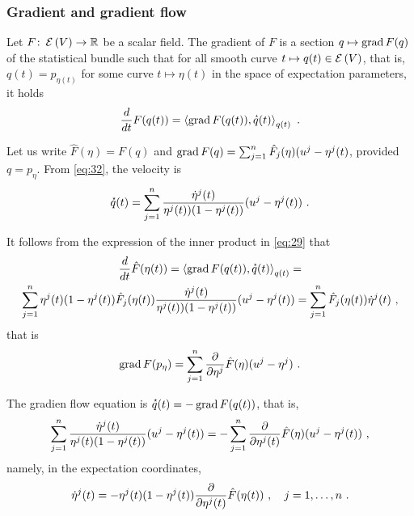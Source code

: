\documentclass[12pt,a4paper]{amsart}
\theoremstyle{remark}
\begin{document}
\subsubsection{Gradient and gradient flow}
\label{sec:gradient}

Let $F \colon \operatorname{\mathcal E}\left(V\right) \to \mathbb{R}$ be a scalar field. The gradient of $F$ is a section  $q \mapsto \operatorname{grad} F(q)$ of the statistical bundle such that for all smooth curve $t \mapsto q(t) \in \operatorname{\mathcal E}\left(V\right)$, that is, $q(t) = p_{\eta(t)}$ for some curve $t \mapsto \eta(t)$ in the space of expectation parameters, it holds
\begin{equation}
  \label{eq:gradient}
  \derivby t F(q(t)) = \scalarat {q(t)} {\Grad F(q(t))}{\velocity q(t)} \ .
\end{equation}

Let us write $\hat F(\eta) = F(q)$ and $\operatorname{grad} F(q) = \sum_{j=1}^n \hat F_j(\eta) (u^j - \eta^j(t)$, provided $q = p_\eta$. From \cref{eq:32}, the velocity is
\begin{equation}
  \label{eq:55}
  \velocity q(t) = \sum_{j=1}^n \frac{\dot \eta^j(t)} {\eta^j(t))(1 - \eta^j(t))} (u^j - \eta^j(t)) \ .
\end{equation}

It follows from the expression of the inner product in \cref{eq:29} that 
\begin{multline}
  \label{eq:54}
  \derivby t \hat F(\eta(t)) = \scalarat {q(t)} {\Grad F(q(t))}{\velocity q(t)} = \\ \sum_{j=1}^n \eta^j(t)(1-\eta^j(t)) \hat F_j(\eta(t)) \frac{\dot \eta^j(t)} {\eta^j(t))(1 - \eta^j(t))} (u^j - \eta^j(t)) = \sum_{j=1}^n \hat F_j(\eta(t)) \dot \eta^j(t) \ , 
\end{multline}
that is
\begin{equation}
  \label{eq:58}
  \Grad F(p_\eta) = \sum_{j=1}^n \pderivby {\eta^j} \hat F(\eta) (u^j - \eta^j) \ .
\end{equation}

The gradien flow equation is $\accentset{\star}{q}(t) = - \operatorname{grad} F(q(t))$, that is,
\begin{equation}
  \label{eq:61}
  \sum_{j=1}^n \frac {\dot\eta^j(t)}{\eta^j(t)(1-\eta^j(t))}(u^j - \eta^j(t)) = - \sum_{j=1}^n \pderivby {\eta^j(t)} \hat F(\eta) (u^j - \eta^j(t)) \ ,
\end{equation}
namely, in the expectation coordinates,
\begin{equation}
  \label{eq:62}
  \dot \eta^j(t) = - \eta^j(t)(1-\eta^j(t))\pderivby {\eta^j(t)} \hat F(\eta(t)) \ , \quad j=1,\dots,n \ .
\end{equation}
\end{document}
